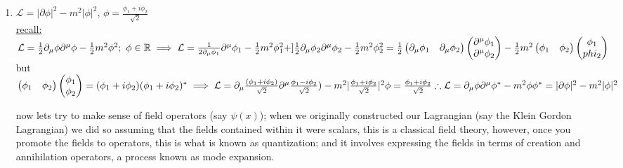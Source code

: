 \documentclass[12pt]{amsart}
\begin{document}
\begin{enumerate}
\item \underline{$\mathcal{L} = | \partial \phi |^2 - m^2 | \phi |^2$},$\,\, \phi = \frac{\phi_1 + i \phi_2}{\sqrt{2}}$\\
\underline{recall:} $\mathcal{L} = \frac{1}{2} \partial_{\mu} \phi \partial^{\mu} \phi - \frac{1}{2} m^2 \phi^2;\,\, \phi \in \mathbb{R}\\
\implies \mathcal{L} = \frac{1}{2 \partial_{\mu} \phi_1} \partial^{\mu} \phi_1 - \frac{1}{2} m^2 \phi_1^2 + ]\frac{1}{2} \partial_{\mu} \phi_2 \partial^{\mu} \phi_2 - \frac{1}{2} m^2 \phi_2^2\\
= \frac{1}{2} \begin{pmatrix} \partial_{\mu} \phi_1 & \partial_{\mu} \phi_2 \end{pmatrix} \begin{pmatrix} \partial^{\mu} \phi_1 \\ \partial^{\mu} \phi_2 \end{pmatrix} - \frac{1}{2} m^2 \begin{pmatrix} \phi_1 & \phi_2 \end{pmatrix} \begin{pmatrix} \phi_1 \\ phi_2 \end{pmatrix}\\$
but $\begin{pmatrix} \phi_1 & \phi_2 \end{pmatrix} \begin{pmatrix} \phi_1 \\ \phi_2 \end{pmatrix} = ( \phi_1 + i \phi_2 ) ( \phi_1 + i \phi_2 )^*\\
\implies \mathcal{L} = \partial_{\mu} \frac{( \phi_1 + i \phi_2)}{\sqrt{2}} \partial^{\mu} \frac{\phi_1 - i \phi_2}{\sqrt{2}}) - m^2 | \frac{\phi_1 + i \phi_2}{\sqrt{2}}|^2\\
\phi= \frac{\phi_1 + i \phi_2}{\sqrt{2}}\\
\therefore \mathcal{L} = \partial_{\mu} \phi \partial^{\mu} \phi^* - m^2 \phi \phi^*\\
= | \partial \phi|^2 - m^2 | \phi|^2\\$


\hdashrule[0.5ex][c]{\linewidth}{0.5pt}{1.5mm}


now lets try to make sense of field operators (say $\psi(x)$); when we originally constructed our Lagrangian (say the Klein Gordon Lagrangian) we did so assuming that the fields contained within it were scalars, this is a classical field theory, however, once you promote the fields to operators, this is what is known as quantization; and it involves expressing the fields in terms of creation and annihilation operators, a process known as mode expansion.\\



\end{enumerate}
\end{document}
